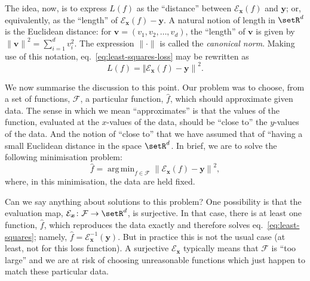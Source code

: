 \documentclass[10pt, a4paper]{article}
\DeclareMathOperator*{\argmin}{arg\,min}
\begin{document}
The idea, now, is to express $L(f)$ as the “distance” between
$\mathcal{E}_{\bm{x}}(f)$ and $\bm{y}$; or, equivalently, as the “length” of
$\mathcal{E}_{\bm{x}}(f)-\bm{y}$. A natural notion of length in
$\setR^d$ is the Euclidean distance: for
$\bm{v}=(v_1, v_2, \dotsc, v_d)$, the “length” of $\bm{v}$ is given by
${\lVert \bm{v} \rVert}^2 = \sum_{i=1}^d v_i^2$. The expression
$\lVert\cdot\rVert$ is called the \emph{canonical norm}.  Making use of
this notation, eq.~\eqref{eq:least-squares-loss} may be rewritten as
\begin{equation}
  \label{eq:norm-loss}
  L(f) = {\Vert \mathcal{E}_{\bm{x}}(f) - \bm{y}\rVert }^2.
\end{equation}

We now summarise the discussion to this point. Our problem was to
choose, from a set of functions, $\mathcal{F}$, a particular function,
$\hat{f}$, which should approximate given data. The sense in which we
mean “approximates” is that the values of the function, evaluated at
the $x$-values of the data, should be “close to” the $y$-values of the
data. And the notion of “close to” that we have assumed that of
“having a small Euclidean distance in the space $\setR^d$. In brief,
we are to solve the following minimisation problem:
\begin{equation}
  \label{eq:least-squares}
  \hat{f} = \argmin_{f\in\mathcal{F}} {\lVert \mathcal{E}_{\bm{x}}(f) - \bm{y}\rVert}^2,
\end{equation}
where, in this minimisation, the data are held fixed.

Can we say anything about solutions to this problem? One possibility
is that the evaluation map,
$\mathcal{E}_{\bm{x}}\colon \mathcal{F} \to \setR^d$, is surjective. In that case, there is
at least one function, $\hat{f}$, which reproduces the data exactly
and therefore solves eq.~\ref{eq:least-squares}; namely,
$\hat{f}=\mathcal{E}_{\bm{x}}^{-1}(\bm{y})$. But in practice this is not the
usual case (at least, not for this loss function). A surjective
$\mathcal{E}_{\bm{x}}$ typically means that $\mathcal{F}$ is “too large” and we are at
risk of choosing unreasonable functions which just happen to match
these particular data.
\end{document}
